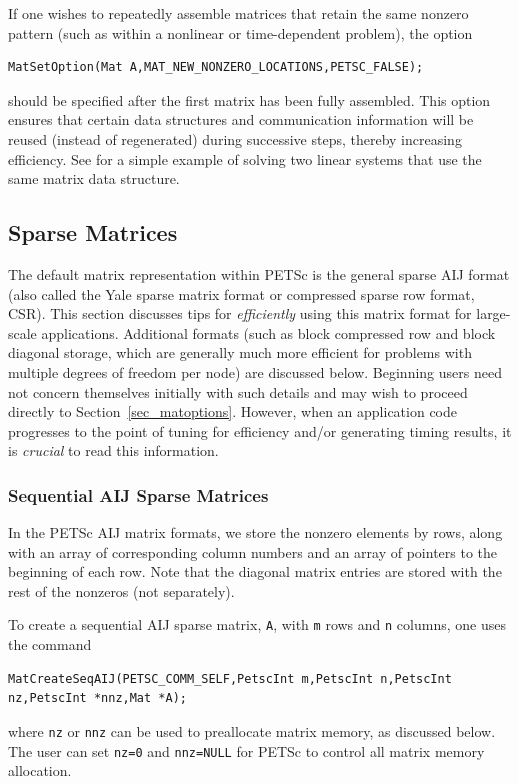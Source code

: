 If one wishes to repeatedly assemble matrices that retain the same
nonzero pattern (such as within a nonlinear or time-dependent
problem), the option
\begin{lstlisting}
MatSetOption(Mat A,MAT_NEW_NONZERO_LOCATIONS,PETSC_FALSE);
\end{lstlisting} 
should be specified after the first matrix has been fully assembled.
This option ensures that certain data structures and communication
information will be reused (instead of regenerated) during successive
steps, thereby increasing efficiency.
See \href{http://www.mcs.anl.gov/petsc/petsc-current/src/ksp/ksp/examples/tutorials/ex5.c.html}{} for a simple example of
solving two linear systems that use the same matrix data structure.

\subsection{Sparse Matrices}
\label{sec_matsparse}

 
The default matrix representation within PETSc is the general sparse
AIJ format (also called the Yale sparse matrix format or compressed
sparse row format, CSR).  This section discusses tips for {\em
efficiently} using this matrix format for large-scale
applications. Additional formats (such as block compressed row and
block diagonal storage, which are generally much more efficient for
problems with multiple degrees of freedom per node) are discussed
below.  Beginning users need not concern themselves initially with
such details and may wish to proceed directly to
Section~\ref{sec_matoptions}.  However, when an application code
progresses to the point of tuning for efficiency and/or generating
timing results, it is {\em crucial} to read this information.

\subsubsection{Sequential AIJ Sparse Matrices}

In the PETSc AIJ matrix formats, we store the nonzero elements
by rows, along with an array of corresponding column numbers and
an array of pointers to the beginning of each row.  Note that the
diagonal matrix entries are stored with the rest of the nonzeros (not
separately).

To create a sequential AIJ sparse matrix, \lstinline{A},
with \lstinline{m} rows and \lstinline{n} columns,
one uses the command
\begin{lstlisting}
MatCreateSeqAIJ(PETSC_COMM_SELF,PetscInt m,PetscInt n,PetscInt nz,PetscInt *nnz,Mat *A);
\end{lstlisting}
where \lstinline{nz} or \lstinline{nnz} can be used to preallocate matrix memory,
as discussed below. The user can set \lstinline{nz=0} and \lstinline{nnz=NULL} for PETSc to control all matrix memory allocation.

